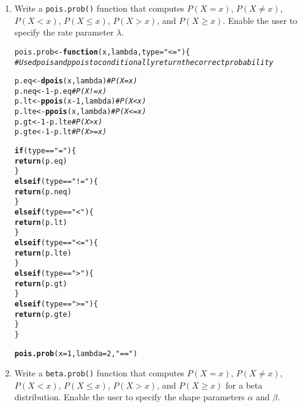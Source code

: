 \documentclass{article}\usepackage[]{graphicx}\usepackage[]{xcolor}
\makeatletter
\newcommand{\hlnum}[1]{\textcolor[rgb]{0.686,0.059,0.569}{#1}}%
\newcommand{\hlsng}[1]{\textcolor[rgb]{0.192,0.494,0.8}{#1}}%
\newcommand{\hlcom}[1]{\textcolor[rgb]{0.678,0.584,0.686}{\textit{#1}}}%
\newcommand{\hlopt}[1]{\textcolor[rgb]{0,0,0}{#1}}%
\newcommand{\hldef}[1]{\textcolor[rgb]{0.345,0.345,0.345}{#1}}%
\newcommand{\hlkwa}[1]{\textcolor[rgb]{0.161,0.373,0.58}{\textbf{#1}}}%
\newcommand{\hlkwb}[1]{\textcolor[rgb]{0.69,0.353,0.396}{#1}}%
\newcommand{\hlkwc}[1]{\textcolor[rgb]{0.333,0.667,0.333}{#1}}%
\newcommand{\hlkwd}[1]{\textcolor[rgb]{0.737,0.353,0.396}{\textbf{#1}}}%
\newenvironment{kframe}{%
 \def\at@end@of@kframe{}%
 \ifinner\ifhmode%
  \def\at@end@of@kframe{\end{minipage}}%
  \begin{minipage}{\columnwidth}%
 \fi\fi%
 \def\FrameCommand##1{\hskip\@totalleftmargin \hskip-\fboxsep
 \colorbox{shadecolor}{##1}\hskip-\fboxsep
     \hskip-\linewidth \hskip-\@totalleftmargin \hskip\columnwidth}%
 \MakeFramed {\advance\hsize-\width
   \@totalleftmargin\z@ \linewidth\hsize
   \@setminipage}}%
 {\par\unskip\endMakeFramed%
 \at@end@of@kframe}
\newenvironment{knitrout}{}{} %
\makeatother
\begin{document}
\begin{enumerate}
\item Write a \texttt{pois.prob()} function that computes $P(X=x)$, $P(X \neq x)$, $P(X<x)$, $P(X \leq x)$, $P(X > x)$, and $P(X \geq x).$ Enable the user to specify the rate parameter $\lambda$.
\begin{knitrout}\scriptsize
{}\color{fgcolor}\begin{kframe}
\begin{alltt}
\hldef{pois.prob} \hlkwb{<-} \hlkwa{function}\hldef{(}\hlkwc{x}\hldef{,} \hlkwc{lambda}\hldef{,} \hlkwc{type}\hldef{=}\hlsng{"<="}\hldef{)\{}
  \hlcom{# Use dpois and ppois to conditionally return the correct probability}

  \hldef{p.eq} \hlkwb{<-} \hlkwd{dpois}\hldef{(x, lambda)}     \hlcom{# P(X = x)}
  \hldef{p.neq} \hlkwb{<-} \hlnum{1} \hlopt{-} \hldef{p.eq}            \hlcom{# P(X != x)}
  \hldef{p.lt} \hlkwb{<-} \hlkwd{ppois}\hldef{(x} \hlopt{-} \hlnum{1}\hldef{, lambda)} \hlcom{# P(X < x)}
  \hldef{p.lte} \hlkwb{<-} \hlkwd{ppois}\hldef{(x, lambda)}    \hlcom{# P(X <= x)}
  \hldef{p.gt}  \hlkwb{<-} \hlnum{1} \hlopt{-} \hldef{p.lte}           \hlcom{# P(X > x)}
  \hldef{p.gte}  \hlkwb{<-} \hlnum{1} \hlopt{-} \hldef{p.lt}           \hlcom{# P(X >= x)}

  \hlkwa{if} \hldef{(type} \hlopt{==} \hlsng{"="}\hldef{) \{}
    \hlkwd{return}\hldef{(p.eq)}
  \hldef{\}}
  \hlkwa{else if} \hldef{(type} \hlopt{==} \hlsng{"!="}\hldef{) \{}
    \hlkwd{return}\hldef{(p.neq)}
  \hldef{\}}
  \hlkwa{else if} \hldef{(type} \hlopt{==} \hlsng{"<"}\hldef{) \{}
    \hlkwd{return}\hldef{(p.lt)}
  \hldef{\}}
  \hlkwa{else if} \hldef{(type} \hlopt{==} \hlsng{"<="}\hldef{) \{}
    \hlkwd{return}\hldef{(p.lte)}
  \hldef{\}}
  \hlkwa{else if} \hldef{(type} \hlopt{==} \hlsng{">"}\hldef{) \{}
    \hlkwd{return}\hldef{(p.gt)}
  \hldef{\}}
  \hlkwa{else if} \hldef{(type} \hlopt{==} \hlsng{">="}\hldef{) \{}
    \hlkwd{return}\hldef{(p.gte)}
  \hldef{\}}
\hldef{\}}

\hlkwd{pois.prob}\hldef{(}\hlkwc{x} \hldef{=} \hlnum{1}\hldef{,} \hlkwc{lambda} \hldef{=} \hlnum{2}\hldef{,}\hlsng{"=="}\hldef{)}
\end{alltt}
\end{kframe}
\end{knitrout}
\item Write a \texttt{beta.prob()} function that computes $P(X=x)$, 
$P(X \neq x)$, $P(X<x)$, $P(X \leq x)$, $P(X > x)$, and $P(X \geq x)$
for a beta distribution. Enable the user to specify the shape parameters
$\alpha$ and $\beta$.


\end{enumerate}
\end{document}

